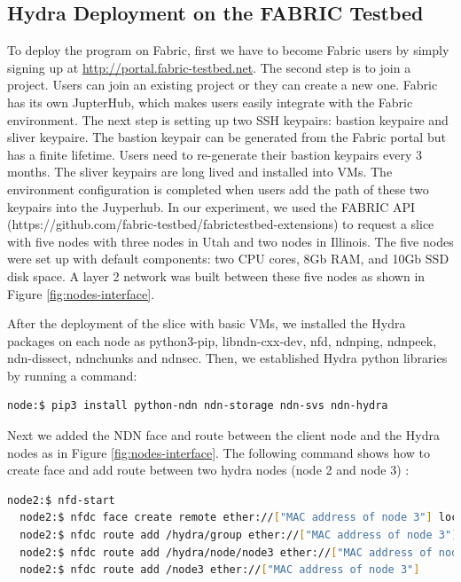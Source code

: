 \lstset{
  aboveskip=1ex,
  basicstyle=\small\ttfamily,
  belowskip=1ex,
  breaklines=true,
  columns=fullflexible,
  framerule=0pt,
  framexrightmargin=0em,
  framexleftmargin=0em,
  language=[LaTeX]TeX,
  tabsize=2
}

\subsection{Hydra Deployment on the FABRIC Testbed}
To deploy the program on Fabric, first we have to become Fabric users by simply signing up at \url{http://portal.fabric-testbed.net}. The second step is to join a project. Users can join an existing project or they can create a new one. Fabric has its own JupterHub, which makes users easily integrate with the Fabric environment. The next step is setting up two SSH keypairs: bastion keypaire and sliver keypaire. The bastion keypair can be generated from the Fabric portal but has a finite lifetime. Users need to re-generate their bastion keypairs every 3 months. The sliver keypairs are long lived and installed into VMs. The environment configuration is completed when users add the path of these two keypairs into the Juyperhub. In our experiment, we used the FABRIC API (https://github.com/fabric-testbed/fabrictestbed-extensions) to request a slice with five nodes with three nodes in Utah and two nodes in Illinois. The five nodes were set up with default components: two CPU cores, 8Gb RAM, and 10Gb SSD disk space.  A layer 2 network was built between these five nodes as shown in Figure \ref{fig:nodes-interface}. 

After the deployment of the slice with basic VMs, we installed the Hydra packages on each node as python3-pip, libndn-cxx-dev, nfd, ndnping, ndnpeek, ndn-dissect, ndnchunks and ndnsec. Then, we established Hydra python libraries by running a command:

\begin{lstlisting}[language=bash]
    node:$ pip3 install python-ndn ndn-storage ndn-svs ndn-hydra
\end{lstlisting}

Next we added the NDN face and route between the client node and the Hydra nodes as in Figure \ref{fig:nodes-interface}. The following command shows how to create face and add route between two hydra nodes (node 2 and node 3) :
\begin{lstlisting}[language=bash]
  node2:$ nfd-start
  node2:$ nfdc face create remote ether://["MAC address of node 3"] local dev://"Ethernet interface of node 2 with node 3"
  node2:$ nfdc route add /hydra/group ether://["MAC address of node 3"]
  node2:$ nfdc route add /hydra/node/node3 ether://["MAC address of node 3"]
  node2:$ nfdc route add /node3 ether://["MAC address of node 3"]
\end{lstlisting}

